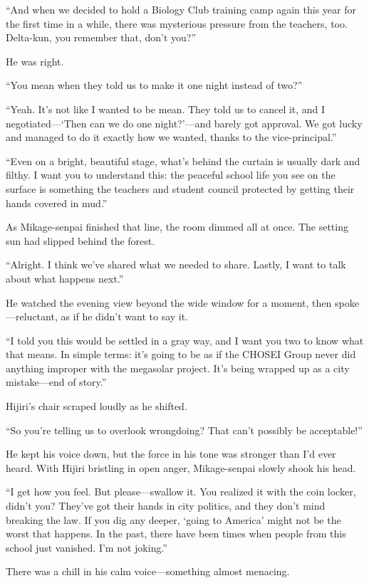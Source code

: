 \documentclass[
    a4paper,
    12pt,
    twoside,
    openany,
    UTF8,
    fontset=windows
]{ctexbook}
\begin{document}
``And when we decided to hold a Biology Club training camp again this year for the first time in a while, there was mysterious pressure from the teachers, too. Delta-kun, you remember that, don't you?''

He was right.

``You mean when they told us to make it one night instead of two?''

``Yeah. It's not like I wanted to be mean. They told us to cancel it, and I negotiated---`Then can we do one night?'---and barely got approval. We got lucky and managed to do it exactly how we wanted, thanks to the vice-principal.''

``Even on a bright, beautiful stage, what's behind the curtain is usually dark and filthy. I want you to understand this: the peaceful school life you see on the surface is something the teachers and student council protected by getting their hands covered in mud.''

As Mikage-senpai finished that line, the room dimmed all at once.
The setting sun had slipped behind the forest.

``Alright. I think we've shared what we needed to share. Lastly, I want to talk about what happens next.''

He watched the evening view beyond the wide window for a moment, then spoke---reluctant, as if he didn't want to say it.

``I told you this would be settled in a gray way, and I want you two to know what that means. In simple terms: it's going to be as if the CHOSEI Group never did anything improper with the megasolar project. It's being wrapped up as a city mistake---end of story.''

Hijiri's chair scraped loudly as he shifted.

``So you're telling us to overlook wrongdoing? That can't possibly be acceptable!''

He kept his voice down, but the force in his tone was stronger than I'd ever heard. With Hijiri bristling in open anger, Mikage-senpai slowly shook his head.

``I get how you feel. But please---swallow it. You realized it with the coin locker, didn't you? They've got their hands in city politics, and they don't mind breaking the law. If you dig any deeper, `going to America' might not be the worst that happens. In the past, there have been times when people from this school just vanished. I'm not joking.''

There was a chill in his calm voice---something almost menacing.
\end{document}
